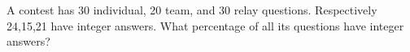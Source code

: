 A contest has 30 individual, 20 team, and 30 relay questions. Respectively 24,15,21 have integer answers. What percentage of all its questions have integer answers?
